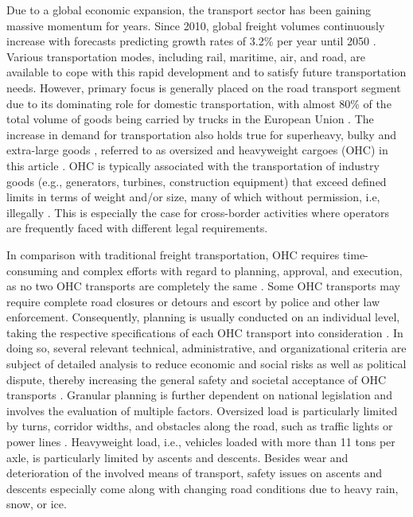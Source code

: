 
Due to a global economic expansion, the transport sector has been gaining massive momentum for years.
Since 2010, global freight volumes continuously increase with forecasts predicting growth rates of 3.2\% per year until 2050 \cite{figura2020preferences, InternationalTransportForum}.
Various transportation modes, including rail, maritime, air, and road, are available to cope with this rapid development and to satisfy future transportation needs.
However, primary focus is generally placed on the road transport segment due to its dominating role for domestic transportation, with almost 80\% of the total volume of goods being carried by trucks in the European Union \cite{Eurostat}.
The increase in demand for transportation also holds true for superheavy, bulky and extra-large goods \cite{gavrilova2021analysis}, referred to as oversized and heavyweight cargoes (OHC) in this article \cite{Luo.2021}.
OHC is typically associated with the transportation of industry goods (e.g., generators, turbines, construction equipment) that exceed defined limits in terms of weight and/or size, many of which without permission, i.e, illegally \cite{fiorillo2016minimizing}. This is especially the case for cross-border activities where operators are frequently faced with different legal requirements. 
\par In comparison with traditional freight transportation, OHC requires time-consuming and complex efforts with regard to planning, approval, and execution, as no two OHC transports are completely the same \cite{Wolnowska.2019}.
Some OHC transports may require complete road closures or detours and escort by police and other law enforcement.
Consequently, planning is usually conducted on an individual level, taking the respective specifications of each OHC transport into consideration \cite{Bazaras.2013}.
In doing so, several relevant technical, administrative, and organizational criteria are subject of detailed analysis to reduce economic and social risks as well as political dispute, thereby increasing the general safety and societal acceptance of OHC transports \cite{Palsaitis.2012}.
Granular planning is further dependent on national legislation and involves the evaluation of multiple factors. Oversized load is particularly limited by turns, corridor widths, and obstacles along the road, such as traffic lights or power lines \cite{PETRASKA.2018}. Heavyweight load, i.e., vehicles loaded with more than 11 tons per axle, is particularly limited by ascents and descents. Besides wear and deterioration of the involved means of transport, safety issues on ascents and descents especially come along with changing road conditions due to heavy rain, snow, or ice.
